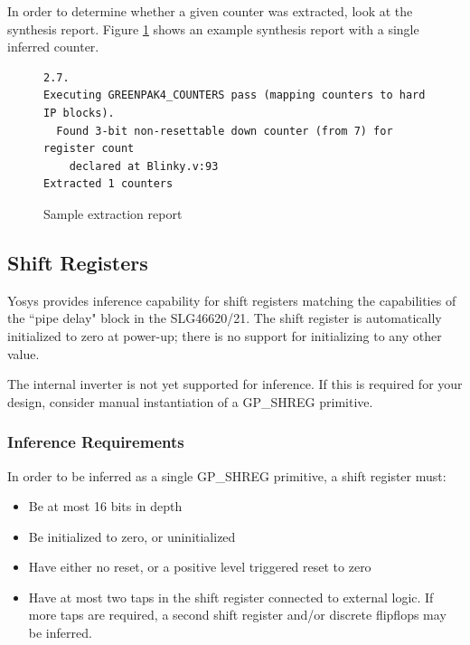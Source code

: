 \documentclass[11pt]{article}
\begin{document}
In order to determine whether a given counter was extracted, look at the synthesis report. Figure 
\ref{counter-extraction} shows an example synthesis report with a single inferred counter.

\begin{figure}[h]
{\small
\begin{verbatim}
2.7.
Executing GREENPAK4_COUNTERS pass (mapping counters to hard IP blocks).
  Found 3-bit non-resettable down counter (from 7) for register count
    declared at Blinky.v:93
Extracted 1 counters
\end{verbatim}
}
\caption{Sample extraction report}
\label{counter-extraction}
\end{figure}


\pagebreak
\subsection{Shift Registers}

Yosys provides inference capability for shift registers matching the capabilities of the ``pipe delay" block in the 
SLG46620/21. The shift register is automatically initialized to zero at power-up; there is no support for initializing 
to any other value.

The internal inverter is not yet supported for inference. If this is required for your design, consider manual 
instantiation of a GP\_SHREG primitive.

\subsubsection{Inference Requirements}

In order to be inferred as a single GP\_SHREG primitive, a shift register must:

\begin{itemize}
\item Be at most 16 bits in depth
\item Be initialized to zero, or uninitialized
\item Have either no reset, or a positive level triggered reset to zero
\item Have at most two taps in the shift register connected to external logic. If more taps are required, a second 
shift register and/or discrete flipflops may be inferred. 
\end{itemize}
\end{document}
